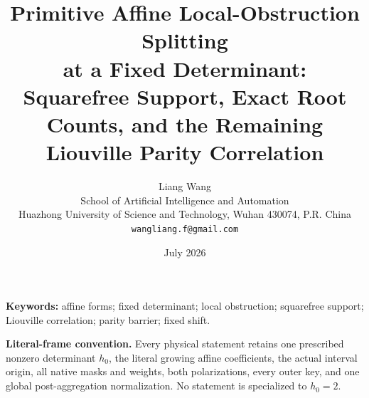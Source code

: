 \documentclass[11pt]{article}
\title{\textbf{Primitive Affine Local-Obstruction Splitting}\\
\textbf{at a Fixed Determinant:}\\
Squarefree Support, Exact Root Counts, and the Remaining
Liouville Parity Correlation}
\author{Liang Wang\\
School of Artificial Intelligence and Automation\\
Huazhong University of Science and Technology, Wuhan 430074, P.R. China\\
\texttt{wangliang.f@gmail.com}}
\date{July 2026}
\theoremstyle{definition}
\theoremstyle{remark}
\begin{document}
\maketitle



\noindent\textbf{Keywords:}
affine forms; fixed determinant; local obstruction; squarefree
support; Liouville correlation; parity barrier; fixed shift.

\medskip
\noindent\textbf{Literal-frame convention.}
Every physical statement retains one prescribed nonzero determinant
\(h_0\), the literal growing affine coefficients, the actual
interval origin, all native masks and weights, both polarizations,
every outer key, and one global post-aggregation normalization.
No statement is specialized to \(h_0=2\).










\begingroup
\footnotesize
\raggedright


\endgroup
\end{document}
